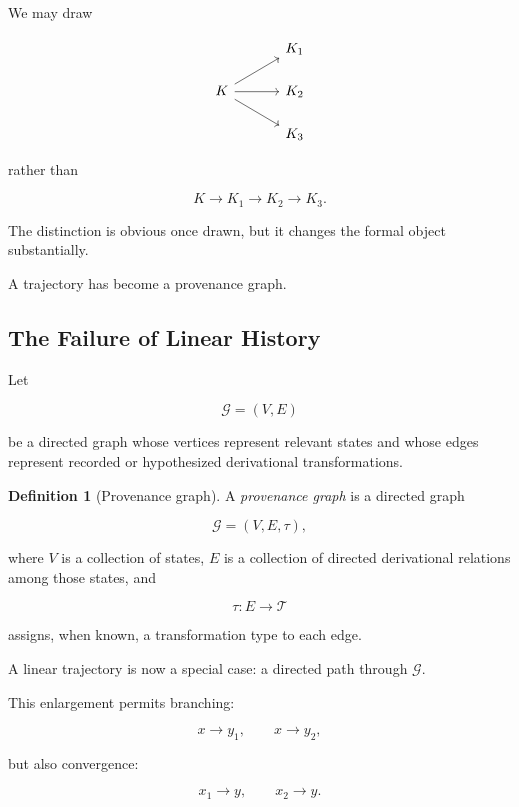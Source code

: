 \documentclass[
  11pt,
  a4paper,
  DIV=12,
  BCOR=0mm,
  parskip=half-
]{scrartcl}
\newcommand{\graphG}{\mathcal G}
\theoremstyle{definition}
\newtheorem{definition}{Definition}[section]
\theoremstyle{plain}
\theoremstyle{remark}
\begin{document}
We may draw

\[
\begin{tikzcd}[column sep=3.2em,row sep=1.5em]
& K_1 \\
K \arrow[ur] \arrow[r] \arrow[dr] & K_2 \\
& K_3
\end{tikzcd}
\]

rather than

\[
  K\longrightarrow K_1\longrightarrow K_2\longrightarrow K_3.
\]

The distinction is obvious once drawn, but it changes the formal object
substantially.

A trajectory has become a provenance graph.


\subsection{The Failure of Linear History}
\label{sec:failure-linear-history}

Let

\[
  \graphG=(V,E)
\]

be a directed graph whose vertices represent relevant states and whose edges
represent recorded or hypothesized derivational transformations.

\begin{definition}[Provenance graph]
\label{def:provenance-graph}
A \emph{provenance graph} is a directed graph

\[
  \graphG=(V,E,\tau),
\]

where \(V\) is a collection of states, \(E\) is a collection of directed
derivational relations among those states, and

\[
  \tau:E\longrightarrow\mathcal T
\]

assigns, when known, a transformation type to each edge.
\end{definition}

A linear trajectory is now a special case: a directed path through
\(\graphG\).

This enlargement permits branching:

\[
  x\longrightarrow y_1,
  \qquad
  x\longrightarrow y_2,
\]

but also convergence:

\[
  x_1\longrightarrow y,
  \qquad
  x_2\longrightarrow y.
\]
\end{document}
